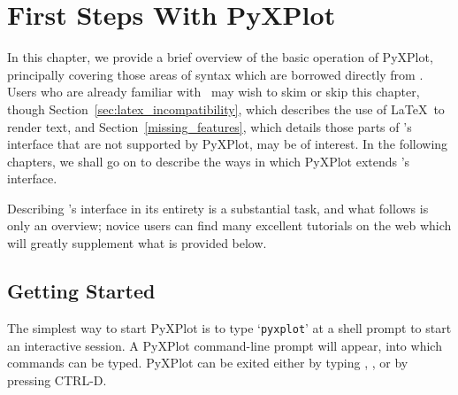 %
%
%
%
%



\chapter{First Steps With PyXPlot}
\label{gnuplot_intro}

In this chapter, we provide a brief overview of the basic operation of PyXPlot,
principally covering those areas of syntax which are borrowed directly from
\gnuplot. Users who are already familiar with \gnuplot\ may wish to skim or
skip this chapter, though Section~\ref{sec:latex_incompatibility}, which
describes the use of \LaTeX\ to render text, and
Section~\ref{missing_features}, which details those parts of \gnuplot's
interface that are not supported by PyXPlot, may be of interest. In the
following chapters, we shall go on to describe the ways in which PyXPlot
extends \gnuplot's interface.

Describing \gnuplot's interface in its entirety is a substantial task, and what
follows is only an overview; novice users can find many excellent tutorials on
the web which will greatly supplement what is provided below.

\section{Getting Started}

The simplest way to start PyXPlot is to type `{\tt pyxplot}' at a shell prompt
to start an interactive session. A PyXPlot command-line prompt will appear,
into which commands can be typed. PyXPlot can be exited either by typing
, , or by pressing CTRL-D.

